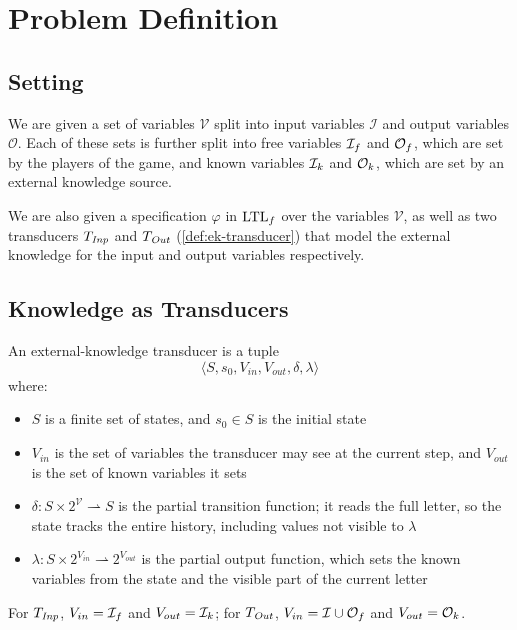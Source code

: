 \section{Problem Definition}\label{sec:problem}

\subsection{Setting}

We are given a set of variables $\mathcal{V}$ split into input variables $\mathcal{I}$ and output variables $\mathcal{O}$.
Each of these sets is further split into free variables $\mathcal{I}_{f}$ and $\mathcal{O}_{f}$, which are set by the players of the game, and known variables $\mathcal{I}_{k}$ and $\mathcal{O}_{k}$, which are set by an external knowledge source.

We are also given a specification $\varphi$ in $\text{LTL}_f$ over the variables $\mathcal{V}$, as well as two transducers $T_{\mathit{Inp}}$ and $T_{\mathit{Out}}$ (\cref{def:ek-transducer}) that model the external knowledge for the input and output variables respectively.

\subsection{Knowledge as Transducers}

\begin{definition}\label{def:ek-transducer}
An external-knowledge transducer is a tuple
\[
  \langle S, s_0, V_{in}, V_{out}, \delta, \lambda \rangle
\]
where:

\begin{itemize}
  \item $S$ is a finite set of states, and $s_0 \in S$ is the initial state
  \item $V_{in}$ is the set of variables the transducer may see at the current step, and $V_{out}$ is the set of known variables it sets
  \item $\delta: S \times 2^{\mathcal{V}} \rightharpoonup S$ is the partial transition function; it reads the full letter, so the state tracks the entire history, including values not visible to $\lambda$
  \item $\lambda: S \times 2^{V_{in}} \rightharpoonup 2^{V_{out}}$ is the partial output function, which sets the known variables from the state and the visible part of the current letter
\end{itemize}

For $T_{\mathit{Inp}}$, $V_{in} = \mathcal{I}_{f}$ and $V_{out} = \mathcal{I}_{k}$; for $T_{\mathit{Out}}$, $V_{in} = \mathcal{I} \cup \mathcal{O}_{f}$ and $V_{out} = \mathcal{O}_{k}$.
\end{definition}

